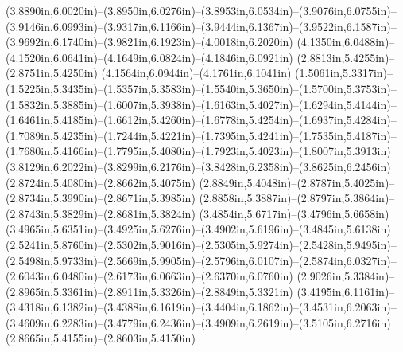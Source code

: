 (3.8890in,6.0020in)--(3.8950in,6.0276in)--(3.8953in,6.0534in)--(3.9076in,6.0755in)--(3.9146in,6.0993in)--(3.9317in,6.1166in)--(3.9444in,6.1367in)--(3.9522in,6.1587in)--(3.9692in,6.1740in)--(3.9821in,6.1923in)--(4.0018in,6.2020in) (4.1350in,6.0488in)--(4.1520in,6.0641in)--(4.1649in,6.0824in)--(4.1846in,6.0921in) (2.8813in,5.4255in)--(2.8751in,5.4250in) (4.1564in,6.0944in)--(4.1761in,6.1041in) (1.5061in,5.3317in)--(1.5225in,5.3435in)--(1.5357in,5.3583in)--(1.5540in,5.3650in)--(1.5700in,5.3753in)--(1.5832in,5.3885in)--(1.6007in,5.3938in)--(1.6163in,5.4027in)--(1.6294in,5.4144in)--(1.6461in,5.4185in)--(1.6612in,5.4260in)--(1.6778in,5.4254in)--(1.6937in,5.4284in)--(1.7089in,5.4235in)--(1.7244in,5.4221in)--(1.7395in,5.4241in)--(1.7535in,5.4187in)--(1.7680in,5.4166in)--(1.7795in,5.4080in)--(1.7923in,5.4023in)--(1.8007in,5.3913in) (3.8129in,6.2022in)--(3.8299in,6.2176in)--(3.8428in,6.2358in)--(3.8625in,6.2456in) (2.8724in,5.4080in)--(2.8662in,5.4075in) (2.8849in,5.4048in)--(2.8787in,5.4025in)--(2.8734in,5.3990in)--(2.8671in,5.3985in) (2.8858in,5.3887in)--(2.8797in,5.3864in)--(2.8743in,5.3829in)--(2.8681in,5.3824in) (3.4854in,5.6717in)--(3.4796in,5.6658in) (3.4965in,5.6351in)--(3.4925in,5.6276in)--(3.4902in,5.6196in)--(3.4845in,5.6138in) (2.5241in,5.8760in)--(2.5302in,5.9016in)--(2.5305in,5.9274in)--(2.5428in,5.9495in)--(2.5498in,5.9733in)--(2.5669in,5.9905in)--(2.5796in,6.0107in)--(2.5874in,6.0327in)--(2.6043in,6.0480in)--(2.6173in,6.0663in)--(2.6370in,6.0760in) (2.9026in,5.3384in)--(2.8965in,5.3361in)--(2.8911in,5.3326in)--(2.8849in,5.3321in) (3.4195in,6.1161in)--(3.4318in,6.1382in)--(3.4388in,6.1619in)--(3.4404in,6.1862in)--(3.4531in,6.2063in)--(3.4609in,6.2283in)--(3.4779in,6.2436in)--(3.4909in,6.2619in)--(3.5105in,6.2716in) (2.8665in,5.4155in)--(2.8603in,5.4150in)

